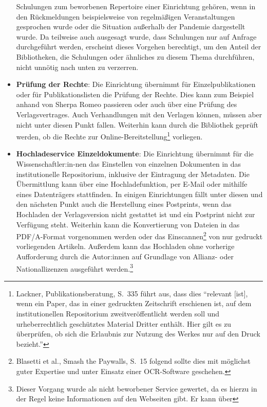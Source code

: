 \documentclass[a4paper,
fontsize=11pt,
oneside,
numbers=noperiodatend,
parskip=half-,
bibliography=totoc,
final
]{scrartcl}
\begin{document}
\begin{itemize}
{    Schulungen zum beworbenen Repertoire einer Einrichtung gehören, wenn
    in den Rückmeldungen beispielsweise von regelmäßigen Veranstaltungen
    gesprochen wurde oder die Situation außerhalb der Pandemie
    dargestellt wurde. Da teilweise auch ausgesagt wurde, dass
    Schulungen nur auf Anfrage durchgeführt werden, erscheint dieses
    Vorgehen berechtigt, um den Anteil der Bibliotheken, die Schulungen
    oder ähnliches zu diesem Thema durchführen, nicht unnötig nach unten
    zu verzerren.}
\item
  \textbf{Prüfung der Rechte}: Die Einrichtung übernimmt für
  Einzelpublikationen oder für Publikationslisten die Prüfung der
  Rechte. Dies kann zum Beispiel anhand von Sherpa Romeo passieren oder
  auch über eine Prüfung des Verlagsvertrages. Auch Verhandlungen mit
  den Verlagen können, müssen aber nicht unter diesen Punkt fallen.
  Weiterhin kann durch die Bibliothek geprüft werden, ob die Rechte zur
  Online-Bereitstellung\footnote{Lackner, Publikationsberatung, S.~335
    führt aus, dass dies \enquote{relevant {[}ist{]}, wenn ein Paper,
    das in einer gedruckten Zeitschrift erschienen ist, auf dem
    institutionellen Repositorium zweitveröffentlicht werden soll und
    urheberrechtlich geschütztes Material Dritter enthält. Hier gilt es
    zu überprüfen, ob sich die Erlaubnis zur Nutzung des Werkes nur auf
    den Druck bezieht.}} vorliegen.
\item
  \textbf{Hochladeservice Einzeldokumente}: Die Einrichtung übernimmt
  für die Wissenschaftler:in-nen das Einstellen von einzelnen Dokumenten
  in das institutionelle Repositorium, inklusive der Eintragung der
  Metadaten. Die Übermittlung kann über eine Hochladefunktion, per
  E-Mail oder mithilfe eines Datenträgers stattfinden. In einigen
  Einrichtungen fällt unter diesen und den nächsten Punkt auch die
  Herstellung eines Postprints, wenn das Hochladen der Verlagsversion
  nicht gestattet ist und ein Postprint nicht zur Verfügung steht.
  Weiterhin kann die Konvertierung von Dateien in das PDF/A-Format
  vorgenommen werden oder das Einscannen\footnote{Blasetti et al., Smash
    the Paywalls, S.~15 folgend sollte dies mit möglichst guter
    Expertise und unter Einsatz einer OCR-Software geschehen.} von nur
  gedruckt vorliegenden Artikeln. Außerdem kann das Hochladen ohne
  vorherige Aufforderung durch die Autor:innen auf Grundlage von
  Allianz- oder Nationallizenzen ausgeführt werden.\footnote{Dieser
    Vorgang wurde als nicht beworbener Service gewertet, da es hierzu in
    der Regel keine Informationen auf den Webseiten gibt. Er kann über
}
\end{itemize}
\end{document}
